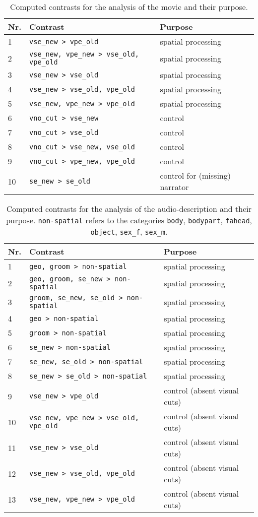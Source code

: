 \documentclass[english]{article}
\begin{document}
\begin{table*}[tbp]
\caption{Computed contrasts for the analysis of the movie and their purpose.}
\label{tab:av-contrasts}
\begin{tabular}{lll}
\toprule
\textbf{Nr.} &  \textbf{Contrast} & \textbf{Purpose} \\
\midrule
1 & \texttt{vse\_new > vpe\_old} & spatial processing \tabularnewline
2 & \texttt{vse\_new, vpe\_new > vse\_old, vpe\_old} & spatial processing \tabularnewline
3 & \texttt{vse\_new > vse\_old} & spatial processing \tabularnewline
4 & \texttt{vse\_new > vse\_old, vpe\_old} & spatial processing \tabularnewline
5 & \texttt{vse\_new, vpe\_new > vpe\_old} & spatial processing \tabularnewline
6 & \texttt{vno\_cut > vse\_new} & control \tabularnewline
7 & \texttt{vno\_cut > vse\_old} & control \tabularnewline
8 & \texttt{vno\_cut > vse\_new, vse\_old} & control \tabularnewline
9 & \texttt{vno\_cut > vpe\_new, vpe\_old} & control \tabularnewline
10 & \texttt{se\_new > se\_old} & control for (missing) narrator \tabularnewline
\bottomrule
\end{tabular}
\end{table*}


\begin{table*}[tbp]
\caption{Computed contrasts for the analysis of the audio-description and their purpose.
    \texttt{non-spatial} refers to the categories
    \texttt{body}, \texttt{bodypart}, \texttt{fahead},
    \texttt{object}, \texttt{sex\_f}, \texttt{sex\_m}.}
\label{tab:ao-contrasts}
\begin{tabular}{lll}
\toprule
\textbf{Nr.} &  \textbf{Contrast} & \textbf{Purpose} \\
\midrule
1 & \texttt{geo, groom > non-spatial} & spatial processing \tabularnewline
2 & \texttt{geo, groom, se\_new > non-spatial} & spatial processing \tabularnewline
3 & \texttt{groom, se\_new, se\_old > non-spatial}  & spatial processing \tabularnewline
4 & \texttt{geo > non-spatial} & spatial processing \tabularnewline
5 & \texttt{groom > non-spatial} & spatial processing \tabularnewline
6 & \texttt{se\_new > non-spatial} & spatial processing \tabularnewline
7 & \texttt{se\_new, se\_old > non-spatial} & spatial processing \tabularnewline
8 & \texttt{se\_new > se\_old > non-spatial} & spatial processing \tabularnewline
9 & \texttt{vse\_new > vpe\_old} & control (absent visual cuts) \tabularnewline
10 & \texttt{vse\_new, vpe\_new > vse\_old, vpe\_old} & control (absent visual cuts) \tabularnewline
11 & \texttt{vse\_new > vse\_old} & control (absent visual cuts) \tabularnewline
12 & \texttt{vse\_new > vse\_old, vpe\_old} & control (absent visual cuts) \tabularnewline
13 & \texttt{vse\_new, vpe\_new > vpe\_old} & control (absent visual cuts) \tabularnewline
\bottomrule
\end{tabular}
\end{table*}
\end{document}
